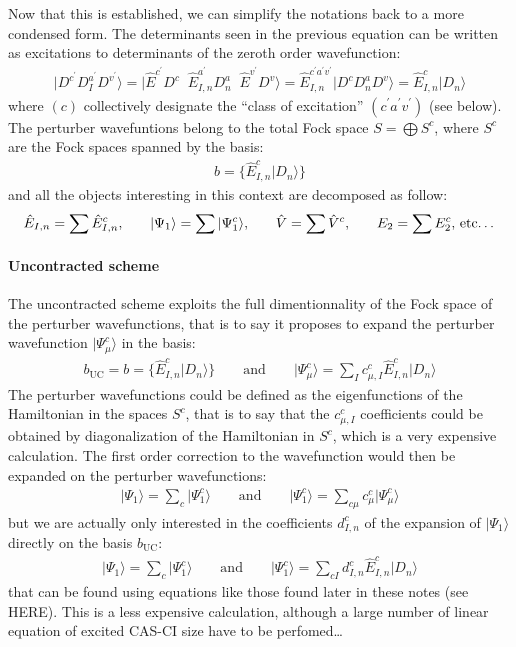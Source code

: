 \documentclass{article}
\newcommand  \equ[2]       {\begin{align}#2\label{#1}\end{align}}
\newcommand  \ket[1]       {\vert #1  \rangle}
\begin{document}
Now that this is established, we can simplify the notations back to a more condensed form.
The determinants seen in the previous equation can be written as excitations to determinants of the zeroth order wavefunction:
\equ{ }{
  \ket{D^{c^\prime} D^{a^\prime}_I D^{v^\prime}}
  =\ket{\hat{E}^{c^\prime}\!\!    D^{c}  \;\;
        \hat{E}^{a^\prime}_{I,n}  D^{a}_n\;\;
        \hat{E}^{v^\prime}\!\!    D^{v}}
  =\hat{E}^{c^\prime a^\prime v^\prime}_{I,n}\ket{D^c D^a_n D^v}
  =\hat{E}^c_{I,n}\ket{D_n}
}
where $(c)$ collectively designate the ``class of excitation'' $(c^\prime a^\prime v^\prime)$
(see below). 
The perturber wavefuntions belong to the total Fock space $S=\bigoplus S^c$, where $S^c$ are the Fock spaces spanned by the basis:
\equ{ }{
  b=\{\hat{E}^c_{I,n}\ket{D_n}\}
}
and all the objects interesting in this context are decomposed as follow:
\equ{ }{
  \hat{E}_{I,n}=\sum \hat{E}_{I,n}^c
  \text{,}\qquad
  \ket{\Psi_1}=\sum \ket{\Psi_1^c}
  \text{,}\qquad
  \hat{V}=\sum \hat{V}^c
  \text{,}\qquad
  E_2=\sum E_2^c
  \text{, etc\dots}
}

\paragraph{Uncontracted scheme}

The uncontracted scheme exploits the full dimentionnality of the Fock space of the perturber wavefunctions, that is to say it proposes to expand the perturber wavefunction $\ket{\Psi^c_\mu}$ in the basis:
\equ{ }{
  b_\text{UC}=b=\{\hat{E}^c_{I,n}\ket{D_n}\}
  \qquad\text{and}\qquad
  \ket{\Psi^c_\mu}=\sum_I c^c_{\mu,I} \hat{E}^c_{I,n}\ket{D_n}
}
The perturber wavefunctions could be defined as the eigenfunctions of the Hamiltonian in the spaces $S^c$,
that is to say that the $c^c_{\mu,I}$ coefficients could be obtained by diagonalization of the Hamiltonian in $S^c$, which is a very expensive calculation.
The first order correction to the wavefunction would then be expanded on the perturber wavefunctions:
\equ{ }{
  \ket{\Psi_1}=\sum_{c} \ket{\Psi_1^c}
  \qquad\text{and}\qquad
  \ket{\Psi_1^c}=\sum_{c \mu} c^c_\mu \ket{\Psi^c_\mu}
}
but we are actually only interested in the coefficients $d^c_{I,n}$ of the expansion of $\ket{\Psi_1}$ directly on the basis $b_\text{UC}$:
\equ{ }{
  \ket{\Psi_1}=\sum_{c} \ket{\Psi_1^c}
  \qquad\text{and}\qquad
  \ket{\Psi_1^c}=\sum_{c I} d^c_{I,n} \hat{E}^c_{I,n}\ket{D_n}
}
that can be found using equations like those found later in these notes (see HERE). This is a less expensive calculation, although a large number of linear equation of excited CAS-CI size have to be perfomed\dots
\end{document}
